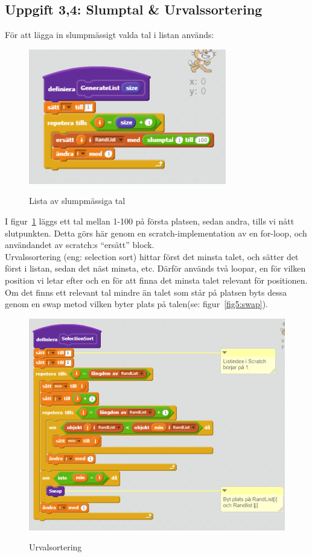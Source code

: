 \documentclass[12pt,a4paper]{article}
\begin{document}
\subsection{Uppgift 3,4: Slumptal \& Urvalssortering}
För att lägga in slumpmässigt valda tal i listan används: \\
\begin{figure}[H]
	\caption{Lista av slumpmässiga tal}
	\centering
	\includegraphics[scale=0.8]{listgen}
	\label{fig3:randlist} 
\end{figure}
I figur~\ref{fig3:randlist} läggs ett tal mellan 1-100 på första platsen, sedan andra, tills vi nått slutpunkten. Detta görs här genom en scratch-implementation av en for-loop, och användandet av scratch:s ``ersätt'' block.
 \\
Urvalssortering (eng: selection sort) hittar först det minsta talet, och sätter det först i listan, sedan det näst minsta, etc. Därför används två loopar, en för vilken position vi letar efter och en för att finna det minsta talet relevant för positionen. Om det finns ett relevant tal mindre än talet som står på platsen byts dessa genom en swap metod vilken byter plats på talen(se: figur~\ref{fig5:swap}).  \\
\begin{figure}[H]
	\caption{Urvalsortering}
	\includegraphics[scale=0.8]{selection}
	\label{fig4:selectionsort}
\end{figure}
\end{document}
